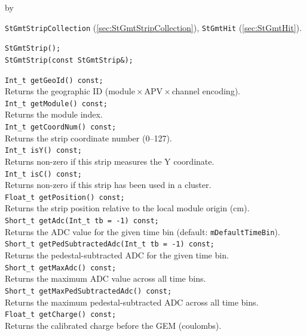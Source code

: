 \documentclass[twoside]{article}
\newcommand{\entrylabel}[1]{\mbox{\textbf{{#1}}}\hfil}%
\newenvironment{entry}
{\begin{list}{}%
    {\renewcommand{\makelabel}{\entrylabel}%
     \setlength{\labelwidth}{90pt}%
     \setlength{\leftmargin}{\labelwidth}
     \advance\leftmargin by \labelsep%
      }%
    }%
  {\end{list}}
\newcommand{\Entrylabel}[1]%
{\raisebox{0pt}[1ex][0pt]{\makebox[\labelwidth][l]%
    {\parbox[t]{\labelwidth}{\hspace{0pt}\textbf{{#1}}}}}}
\newenvironment{Entry}%
{\renewcommand{\entrylabel}{\Entrylabel}\begin{entry}}%
  {\end{entry}}
\begin{document}
\begin{Entry}
\item[Related Classes]
    \texttt{StGmtStripCollection} (\ref{sec:StGmtStripCollection}),
    \texttt{StGmtHit} (\ref{sec:StGmtHit}).
\item[Public\\ Constructors]
    \verb+StGmtStrip();+\\
    \verb+StGmtStrip(const StGmtStrip&);+\\
\item[Public Member\\ Functions]
    \verb+Int_t getGeoId() const;+\\
    Returns the geographic ID (module\,$\times$\,APV\,$\times$\,channel encoding).\\
    \verb+Int_t getModule() const;+\\
    Returns the module index.\\
    \verb+Int_t getCoordNum() const;+\\
    Returns the strip coordinate number (0--127).\\
    \verb+Int_t isY() const;+\\
    Returns non-zero if this strip measures the Y coordinate.\\
    \verb+Int_t isC() const;+\\
    Returns non-zero if this strip has been used in a cluster.\\
    \verb+Float_t getPosition() const;+\\
    Returns the strip position relative to the local module origin (cm).\\
    \verb+Short_t getAdc(Int_t tb = -1) const;+\\
    Returns the ADC value for the given time bin (default: \texttt{mDefaultTimeBin}).\\
    \verb+Short_t getPedSubtractedAdc(Int_t tb = -1) const;+\\
    Returns the pedestal-subtracted ADC for the given time bin.\\
    \verb+Short_t getMaxAdc() const;+\\
    Returns the maximum ADC value across all time bins.\\
    \verb+Short_t getMaxPedSubtractedAdc() const;+\\
    Returns the maximum pedestal-subtracted ADC across all time bins.\\
    \verb+Float_t getCharge() const;+\\
    Returns the calibrated charge before the GEM (coulombs).\\

\end{Entry}
\end{document}

